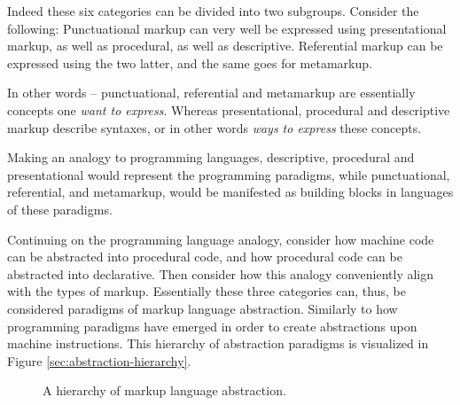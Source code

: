 \documentclass{scrreprt}
\begin{document}
Indeed these six categories can be divided into two subgroups. Consider the following: Punctuational markup can very well be expressed using presentational markup, as well as procedural, as well as descriptive. Referential markup can be expressed using the two latter, and the same goes for metamarkup.

In other words -- punctuational, referential and metamarkup are essentially concepts one \emph{want to express}. Whereas presentational, procedural and descriptive markup describe syntaxes, or in other words \emph{ways to express} these concepts. 

Making an analogy to programming languages, descriptive, procedural and presentational would represent the programming paradigms, while punctuational, referential, and metamarkup, would be manifested as building blocks in languages of these paradigms.

Continuing on the programming language analogy, consider how machine code can be abstracted into procedural code, and how procedural code can be abstracted into declarative. Then consider how this analogy conveniently align with the types of markup. Essentially these three categories can, thus, be considered paradigms of markup language abstraction. Similarly to how programming paradigms have emerged in order to create abstractions upon machine instructions. This hierarchy of abstraction paradigms is visualized in Figure \ref{sec:abstraction-hierarchy}.


\begin{figure}[h]
\centering


\caption{A hierarchy of markup language abstraction.}
\label{fig:markup-types-hierarchy}
\end{figure}


\end{document}
